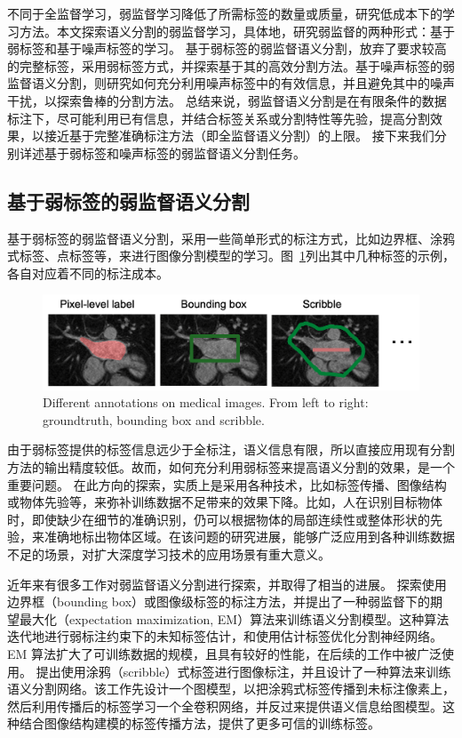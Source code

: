 不同于全监督学习，弱监督学习降低了所需标签的数量或质量，研究低成本下的学习方法。本文探索语义分割的弱监督学习，具体地，研究弱监督的两种形式：基于弱标签和基于噪声标签的学习。
基于弱标签的弱监督语义分割\citep{papandreou2015weakly,rajchl2016deepcut,cai2018accurate,ji2019scribble,kervadec2020bounding}，放弃了要求较高的完整标签，采用弱标签方式，并探索基于其的高效分割方法。基于噪声标签的弱监督语义分割\citep{Zhu2019PickandLearnAQ,Xue2020CascadedRL,Zhang2020RobustMI}，则研究如何充分利用噪声标签中的有效信息，并且避免其中的噪声干扰，以探索鲁棒的分割方法。
总结来说，弱监督语义分割是在有限条件的数据标注下，尽可能利用已有信息，并结合标签关系或分割特性等先验，提高分割效果，以接近基于完整准确标注方法（即全监督语义分割）的上限。
接下来我们分别详述基于弱标签和噪声标签的弱监督语义分割任务。

\subsection{基于弱标签的弱监督语义分割}
基于弱标签的弱监督语义分割，采用一些简单形式的标注方式，比如边界框、涂鸦式标签、点标签等，来进行图像分割模型的学习。图~\ref{c1_fig2}列出其中几种标签的示例，各自对应着不同的标注成本。
    \begin{figure}[t!]
        \centering 
        \includegraphics[width=1.0\textwidth]{img/c1/intro_2.png}
        {Different annotations on medical images. From left to right: groundtruth, bounding box and scribble.}
        \label{c1_fig2}
    \end{figure}
由于弱标签提供的标签信息远少于全标注，语义信息有限，所以直接应用现有分割方法的输出精度较低。故而，如何充分利用弱标签来提高语义分割的效果，是一个重要问题。
在此方向的探索，实质上是采用各种技术，比如标签传播、图像结构或物体先验等，来弥补训练数据不足带来的效果下降。比如，人在识别目标物体时，即使缺少在细节的准确识别，仍可以根据物体的局部连续性或整体形状的先验，来准确地标出物体区域。在该问题的研究进展，能够广泛应用到各种训练数据不足的场景，对扩大深度学习技术的应用场景有重大意义。

近年来有很多工作对弱监督语义分割进行探索，并取得了相当的进展。
\citet{papandreou2015weakly} 探索使用边界框（bounding box）或图像级标签的标注方法，并提出了一种弱监督下的期望最大化（expectation maximization, EM）算法来训练语义分割模型。这种算法迭代地进行弱标注约束下的未知标签估计，和使用估计标签优化分割神经网络。EM 算法扩大了可训练数据的规模，且具有较好的性能，在后续的工作中被广泛使用。
\citet{lin2016scribblesup} 提出使用涂鸦（scribble）式标签进行图像标注，并且设计了一种算法来训练语义分割网络。该工作先设计一个图模型，以把涂鸦式标签传播到未标注像素上，然后利用传播后的标签学习一个全卷积网络，并反过来提供语义信息给图模型。这种结合图像结构建模的标签传播方法，提供了更多可信的训练标签。

